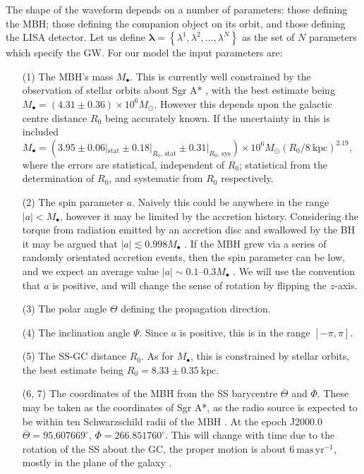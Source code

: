 \documentclass[useAMS,usedcolumn,usegraphicx,usenatbib]{mn2e}
\newcommand{\units}[1]{\ensuremath{~\mathrm{#1}}}
\newcommand{\sub}[1]{\ensuremath{_\mathrm{#1}}}
\begin{document}
The shape of the waveform depends on a number of parameters: those defining the MBH; those defining the companion object on its orbit, and those defining the LISA detector. Let us define $\boldsymbol{\lambda} = \left\{\lambda^1, \lambda^2, \ldots, \lambda^N\right\}$ as the set of $N$ parameters which specify the GW. For our model the input parameters are:
\begin{enumerate}%
\item[(1)] The MBH's mass $M_\bullet$. This is currently well constrained by the observation of stellar orbits about Sgr A* \citep{Ghez2008, Gillessen2009}, with the best estimate being $M_\bullet = (4.31 \pm 0.36) \times 10^6 M_\odot$. However this depends upon the galactic centre distance $R_0$ being accurately known. If the uncertainty in this is included $M_\bullet = (3.95 \pm 0.06|\sub{stat} \pm 0.18|_{R_0, \, \mathrm{stat}} \pm  0.31|_{R_0, \, \mathrm{sys}}) \times 10^6 M_\odot (R_0 / 8\units{kpc})^{2.19}$, where the errors are statistical, independent of $R_0$; statistical from the determination of $R_0$, and systematic from $R_0$ respectively.
\item[(2)] The spin parameter $a$. Naively this could be anywhere in the range $|a| < M_\bullet$, however it may be limited by the accretion history. Considering the torque from radiation emitted by an accretion disc and swallowed by the BH it may be argued that $|a| \lesssim 0.998 M_\bullet$ \citep{Thorne1974}. If the MBH grew via a series of randomly orientated accretion events, then the spin parameter can be low, and we expect an average value $|a| \sim 0.1$--$0.3 M_\bullet$ \citep{King2006, King2008}. We will use the convention that $a$ is positive, and will change the sense of rotation by flipping the $z$-axis.
\item[(3)] The polar angle $\Theta$ defining the propagation direction.
\item[(4)] The inclination angle $\Psi$. Since $a$ is positive, this is in the range $[-\pi, \pi]$.
\item[(5)] The SS-GC distance $R_0$. As for $M_\bullet$, this is constrained by stellar orbits, the best estimate being \citep{Gillessen2009} $R_0 = 8.33 \pm 0.35\units{kpc}$.
\item[(6, 7)] The coordinates of the MBH from the SS barycentre $\overline{\Theta}$ and $\overline{\Phi}$. These may be taken as the coordinates of Sgr A*, as the radio source is expected to be within ten Schwarzschild radii of the MBH \citep{Reid2003,Doeleman2008}. At the epoch J2000.0 \citep{Reid1999} $\overline{\Theta} = {95.607669}^{\circ}$, $\overline{\Phi} = {266.851760}^{\circ}$. This will change with time due to the rotation of the SS about the GC, the proper motion is about $6\units{mas\,yr^{-1}}$, mostly in the plane of the galaxy \citep{Reid1999, Backer1999, Reid2003}.

\end{enumerate}
\end{document}
